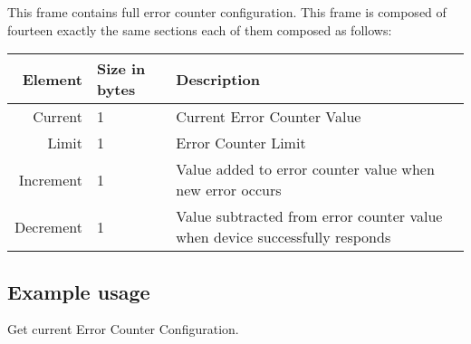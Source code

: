 This frame contains full error counter configuration. This frame is composed of fourteen
 exactly the same sections each of them composed as follows:

\begin{tabular}{r| l | l}
    Element     & Size in bytes & Description \\
    \hline
    Current     & 1 & Current Error Counter Value \\
    Limit       & 1 & Error Counter Limit \\
    Increment   & 1 & Value added to error counter value when new error occurs \\
    Decrement   & 1 & Value subtracted from error counter value when device successfully responds \\
\end{tabular}

\subsection{Example usage}
Get current Error Counter Configuration.


